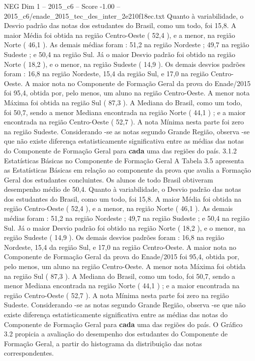 \begin{textsample}{NEG Dim 1 – 2015\_c6 – Score -1.00 – 2015\_c6/enade\_2015\_tec\_des\_inter\_2e210f18ec.txt}
Quanto à variabilidade, o Desvio padrão das notas dos estudantes do Brasil, como um todo, foi 15,8.
A maior Média foi obtida na região Centro-Oeste ( 52,4 ), e a menor, na região Norte ( 46,1 ).
As demais médias foram : 51,2 na região Nordeste ; 49,7 na região Sudeste ; e 50,4 na região Sul.
Já o maior Desvio padrão foi obtido na região Norte ( 18,2 ), e o menor, na região Sudeste ( 14,9 ).
Os demais desvios padrões foram : 16,8 na região Nordeste, 15,4 da região Sul, e 17,0 na região Centro-Oeste.
A maior nota no Componente de Formação Geral da prova do Enade/2015 foi 95,4, obtida por, pelo menos, um aluno na região Centro-Oeste.
A menor nota Máxima foi obtida na região Sul ( 87,3 ).
A Mediana do Brasil, como um todo, foi 50,7, sendo a menor Mediana encontrada na região Norte ( 44,1 ) ; e a maior encontrada na região Centro-Oeste ( 52,7 ).
A nota Mínima nesta parte foi zero na região Sudeste.
Considerando -se as notas segundo Grande Região, observa -se que não existe diferença estatisticamente significativa entre as médias das notas do Componente de Formação Geral para \textbf{cada} uma das regiões do país. 3.1.2 Estatísticas Básicas no Componente de Formação Geral A Tabela 3.5 apresenta as Estatísticas Básicas em relação ao componente da prova que avalia a Formação Geral dos estudantes concluintes.
Os alunos de todo Brasil obtiveram desempenho médio de 50,4.
Quanto à variabilidade, o Desvio padrão das notas dos estudantes do Brasil, como um todo, foi 15,8.
A maior Média foi obtida na região Centro-Oeste ( 52,4 ), e a menor, na região Norte ( 46,1 ).
As demais médias foram : 51,2 na região Nordeste ; 49,7 na região Sudeste ; e 50,4 na região Sul.
Já o maior Desvio padrão foi obtido na região Norte ( 18,2 ), e o menor, na região Sudeste ( 14,9 ).
Os demais desvios padrões foram : 16,8 na região Nordeste, 15,4 da região Sul, e 17,0 na região Centro-Oeste.
A maior nota no Componente de Formação Geral da prova do Enade/2015 foi 95,4, obtida por, pelo menos, um aluno na região Centro-Oeste.
A menor nota Máxima foi obtida na região Sul ( 87,3 ).
A Mediana do Brasil, como um todo, foi 50,7, sendo a menor Mediana encontrada na região Norte ( 44,1 ) ; e a maior encontrada na região Centro-Oeste ( 52,7 ).
A nota Mínima nesta parte foi zero na região Sudeste.
Considerando -se as notas segundo Grande Região, observa -se que não existe diferença estatisticamente significativa entre as médias das notas do Componente de Formação Geral para \textbf{cada} uma das regiões do país.
O Gráfico 3.2 propicia a avaliação do desempenho dos estudantes do Componente de Formação Geral, a partir do histograma da distribuição das notas correspondentes.

\end{textsample}
